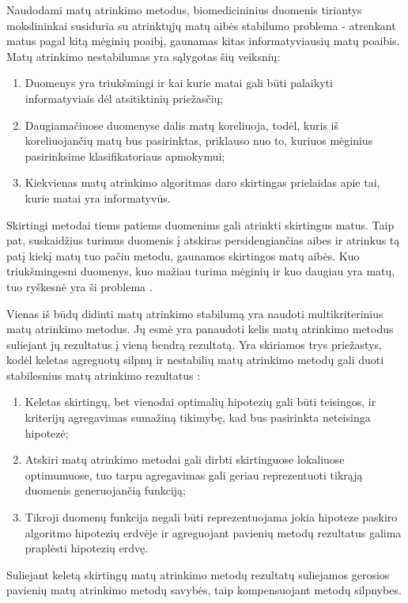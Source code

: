 Naudodami matų atrinkimo metodus, biomedicininius duomenis tiriantys mokslininkai susiduria su atrinktųjų matų aibės stabilumo problema - atrenkant matus pagal kitą mėginių poaibį, gaunamas kitas informatyviausių matų poaibis. Matų atrinkimo nestabilumas yra sąlygotas šių veiksnių:
\begin{enumerate}
 \item Duomenys yra triukšmingi ir kai kurie matai gali būti palaikyti informatyviais dėl atsitiktinių priežasčių;
 \item Daugiamačiuose duomenyse dalis matų koreliuoja, todėl, kuris iš koreliuojančių matų bus pasirinktas, priklauso nuo to, kuriuos mėginius pasirinksime klasifikatoriaus apmokymui;
 \item Kiekvienas matų atrinkimo algoritmas daro skirtingas prielaidas apie tai, kurie matai yra informatyvūs.
\end{enumerate}
Skirtingi metodai tiems patiems duomenims gali atrinkti skirtingus matus. Taip pat, suskaidžius turimus duomenis į atskiras persidengiančias aibes ir atrinkus tą patį kiekį matų tuo pačiu metodu, gaunamos skirtingos matų aibės. Kuo triukšmingesni duomenys, kuo mažiau turima mėginių ir kuo daugiau yra matų, tuo ryškesnė yra ši problema \cite{loscalzo2009consensus}. 

Vienas iš būdų didinti matų atrinkimo stabilumą yra naudoti multikriterinius matų atrinkimo metodus. Jų esmė yra panaudoti kelis matų atrinkimo metodus suliejant jų rezultatus į vieną bendrą rezultatą. Yra skiriamos trys priežastys, kodėl keletas agreguotų silpnų ir nestabilių matų atrinkimo metodų gali duoti stabilesnius matų atrinkimo rezultatus \cite{dietterich2000ensemble}:
\begin{enumerate}
 \item Keletas skirtingų, bet vienodai optimalių hipotezių gali būti teisingos, ir kriterijų agregavimas sumažiną tikimybę, kad bus pasirinkta neteisinga hipotezė;
 \item Atskiri matų atrinkimo metodai gali dirbti skirtinguose lokaliuose optimumuose, tuo tarpu agregavimas gali geriau reprezentuoti tikrąją  duomenis generuojančią funkciją;
 \item Tikroji duomenų funkcija negali būti reprezentuojama jokia hipoteze paskiro algoritmo hipotezių erdvėje ir agreguojant pavienių metodų rezultatus galima praplėsti hipotezių erdvę.
\end{enumerate}
Suliejant keletą skirtingų matų atrinkimo metodų rezultatų suliejamos gerosios pavienių matų atrinkimo metodų savybės, taip kompensuojant metodų silpnybes.

